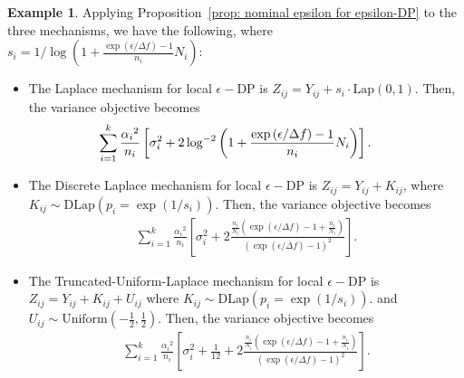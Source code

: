 \documentclass{article}
\theoremstyle{definition}
\newtheorem{example}{Example}
\begin{document}
\begin{example} \label{eg: general variance from the three mechanisms}
    Applying Proposition~\ref{prop: nominal epsilon for epsilon-DP} to the three mechanisms, we have the following, where $s_i = 1 / {\log \left( 1 + \frac{\exp{(\epsilon / \Delta f)} - 1}{n_{i}} N_i \right)}$:
    \begin{itemize}
        \item The Laplace mechanism for local $\epsilon-$DP is $Z_{ij} = Y_{ij} + s_i \cdot \text{Lap}(0,1)$.%
            Then, the variance objective becomes
            \begin{align} \label{stat: general variance from Laplace}
                \hspace{-.6cm}\sum_{i=1}^k \frac{{\alpha_i}^2}{n_i} \left[ \sigma_i^2 + 2 \log^{-2} \left( 1+ \frac{\exp{(\epsilon / \Delta f)}-1}{n_i} N_i \right) \right].
            \end{align}
        \item The Discrete Laplace mechanism for local $\epsilon-$DP is $Z_{ij} = Y_{ij} + K_{ij}$, where 
            $K_{ij} \sim \text{DLap} \left( p_i = \exp(1/s_i)\right)$. %
        Then, the variance objective becomes
        \begin{align} \label{stat: general variance from DLap}
            \sum_{i=1}^k \frac{{\alpha_i}^2}{n_i} \left[ \sigma_i^2 + 2 \frac{ \frac{n_i}{N_i} (\exp{(\epsilon / \Delta f)}-1+\frac{n_i}{N_i})}{(\exp{(\epsilon / \Delta f)}-1)^2} \right].
        \end{align}
        \item The Truncated-Uniform-Laplace mechanism for local $\epsilon-$DP is $Z_{ij} = Y_{ij} + K_{ij} + U_{ij}$
        where $K_{ij} \sim \text{DLap} \left( p_i = \exp(1/s_i)\right)$. %
        and $U_{ij} \sim \text{Uniform}(-\frac{1}{2}, \frac{1}{2})$.
        Then, the variance objective becomes
        \begin{align} \label{stat: general variance from TuLap}
            \sum_{i=1}^k \frac{{\alpha_i}^2}{n_i} \left[  \sigma_i^2 + \frac{1}{12} + 2 \frac{\frac{n_i}{N_i} (\exp{(\epsilon / \Delta f)}-1+\frac{n_i}{N_i})}{(\exp{(\epsilon / \Delta f)}-1)^2} \right].
        \end{align}
    \end{itemize}    
\end{example}
\end{document}
